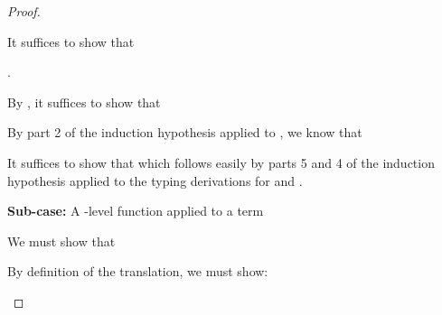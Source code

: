 {\begin{proof}
\begin{proofcases}
\begin{proofcases}

    It suffices to show that

    .

    By , it suffices to show that


    By part 2 of the induction hypothesis applied to
    \im{\styjudg{\slenv,\salpha:\sK}{\se}{\sB}}, we know that

    \im{\cpstyjudg{\slenv^+,\cpsalpha:\sK^+}{\se^\div}{\sB^\div}}

    It suffices to show that
    which follows easily by parts 5 and 4 of the induction hypothesis applied to the typing derivations for
    \im{\sK} and \im{\sB}.
    \end{proofcases}

    \item {}
      \begin{proofcases}
    \item[{\bfseries Sub-case:}] A -level function applied to a term \im{\styjudg{\slenv}{\sappe{\seone}{\setwo}}{\subst{\sB}{\setwo}{\sx}}}

    We must show that

    \im{\styjudg{\slenv^+}{(\sappe{\seone}{\setwo})^\div}{(\subst{\sB}{\setwo}{\sx})^\div}}

    By definition of the translation, we must show:


\end{proofcases}
\end{proofcases}
\end{proof}}

